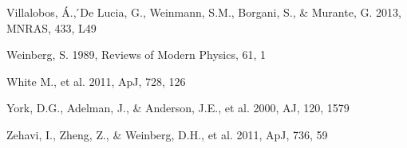 \documentclass[useAMS,usenatbib]{mnras}
\begin{document}
\begin{thebibliography}{}
Villalobos, \'{A}., ́De Lucia, G., Weinmann, S.M., Borgani, S., \& Murante, G. 2013, MNRAS, 433, L49


Weinberg, S. 1989, Reviews of Modern Physics, 61, 1

White M., et al. 2011, ApJ, 728, 126

York, D.G., Adelman, J., \& Anderson, J.E., et al. 2000, AJ, 120, 1579

Zehavi, I., Zheng, Z., \& Weinberg, D.H., et al. 2011, ApJ, 736, 59


\end{thebibliography}

\bsp

\label{lastpage}
\end{document}
